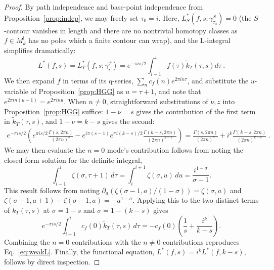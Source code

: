 \documentclass[11pt]{article}
\newcommand{\tk}{\widetilde{k}_T}
\begin{document}
\begin{proof}
By path independence and base-point independence from Proposition~\ref{prop:indep}, 
we may freely set $\tau_0=i$. Here, $L^*_S(f, s; \gamma^S_{\tau_0}) = 0$ (the $S$-contour 
vanishes in length and there are no nontrivial homotopy classes as $f \in M_k^!$ has no poles 
which a finite contour can wrap), and 
the L-integral simplifies dramatically:
\begin{equation}
L^*(f,s) = L^*_T(f, s; \gamma^T_i) =e^{-\pi i s/2}\int_{i-1}^{i} f(\tau)\tk(\tau, s)d\tau~. 
\end{equation}
We then expand $f$ in terms of its q-series, $\sum_n c_f(n)e^{2\pi in\tau}$,
and substitute the $u$-variable of Proposition~\ref{prop:HGG} as 
$u=\tau+1$, and note that $e^{2\pi i n(u-1)}=e^{2\pi i n u}$. 
When $n\neq0$, straightforward substitutions of 
$\nu, z$ into Proposition~\ref{prop:HGG} suffice: $1-\nu=s$ gives the 
contribution of the first term in $\tk(\tau, s)$, and $1-\nu = k-s$ gives the second: 
\begin{align}
e^{-\pi i s/2}\left(e^{\pi i s/2} \frac{\Gamma(s,2\pi n)}{(2\pi n)^s} - e^{i\pi(s-1)}e^{\pi i (k-s)/2} \frac{\Gamma(k-s,2\pi n)}{(2\pi n)^{k-s}}\right) = \frac{\Gamma(s, 2\pi n)}{(2\pi n)^s} + i^k \frac{\Gamma(k-s, 2\pi n)}{(2\pi n)^{k-s}}~.
\end{align}
We may then evaluate the $n=0$ mode's contribution follows from noting the 
closed form solution for the definite integral, 
\begin{equation}\label{eq:hurwitz-antideriv}
\int_{i - 1}^{i}\! \zeta(\sigma, \tau + 1)\,d\tau
 = \int_i^{i + 1}\!\zeta(\sigma, u)\,du
 = \frac{i^{1 - \sigma}}{\sigma - 1}.
\end{equation}
This result follows from noting $\partial_a(\zeta(\sigma-1, a)/(1-\sigma)) = \zeta(\sigma,a)$ 
and $\zeta(\sigma-1, a+1) - \zeta(\sigma-1, a) = -a^{1-\sigma}$. 
Applying this to the two distinct terms of $\widetilde{k}_T(\tau, s)$ at $\sigma = 1 - s$ and $\sigma = 1 - (k - s)$ gives
\begin{equation}\label{eq:const-mode-integral}
e^{-\pi i s/2}\int_{i - 1}^{i}c_f(0)\widetilde{k}_T(\tau, s)\,d\tau
= -c_f(0)\left(\frac{1}{s}  + \frac{i^k}{k - s}\right).
\end{equation}
Combining the $n = 0$ contributions with the $n \neq 0$ contributions reproduces Eq.~\eqref{eq:weakL}. 
Finally, the functional equation, $L^*(f,s)=i^k L^*(f,k-s)$, follows by direct inspection.
\end{proof}
\end{document}
